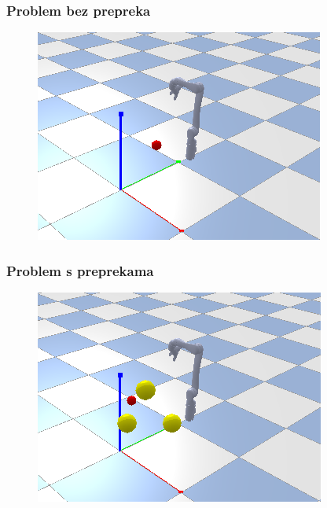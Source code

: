 \documentclass{beamer}
\begin{document}
\begin{frame}
	\frametitle{Problem bez prepreka}

	\begin{figure}[ht!]
		\centering
		\includegraphics[width=\columnwidth]{img/bezprepreka.png}
		\label{fig:bezprepeka}
	\end{figure}

\end{frame}

\begin{frame}
	\frametitle{Problem s preprekama}

	\begin{figure}[ht!]
		\centering
		\includegraphics[width=\columnwidth]{img/spreprekama.png}
		\label{fig:sprepekama}
	\end{figure}

\end{frame}
\end{document}
